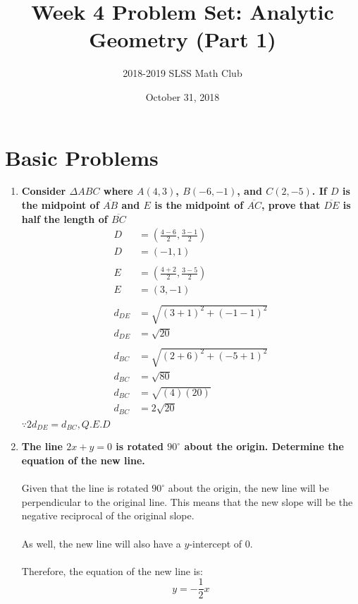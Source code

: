 \documentclass[12pt]{article}
\title{Week 4 Problem Set: Analytic Geometry (Part 1)\vspace{-3mm}}
\author{2018-2019 SLSS Math Club\vspace{-5mm}}
\date{October 31, 2018 \vspace{-5mm}}
\begin{document}
\maketitle

\section*{Basic Problems}
\begin{enumerate}
    \item \textbf{Consider $\Delta ABC$ where $A(4, 3)$, $B(-6, -1)$, and $C(2, -5)$. If $D$ is the midpoint of $\overline{AB}$ and $E$ is the midpoint of $\overline{AC}$, prove that $\overline{DE}$ is half the length of $\overline{BC}$}
    \begin{align*}
        D&=(\frac{4-6}{2}, \frac{3-1}{2}) \\
        D&=(-1, 1) \\ \\
        E&=(\frac{4+2}{2}, \frac{3-5}{2}) \\
        E&=(3, -1) \\ \\
        d_{DE}&=\sqrt{(3+1)^2+(-1-1)^2} \\
        d_{DE}&=\sqrt{20} \\ \\
        d_{BC}&=\sqrt{(2+6)^2+(-5+1)^2} \\
        d_{BC}&=\sqrt{80} \\ 
        d_{BC}&=\sqrt{(4)(20)} \\
        d_{BC}&=2\sqrt{20} \\ 
    \end{align*}
    $\because 2d_{DE} = d_{BC}, Q.E.D$
    
    \item \textbf{The line $2x + y = 0$ is rotated $90^{\circ}$ about the origin. Determine the equation of the new line.} \\ \\
    Given that the line is rotated $90^{\circ}$ about the origin, the new line will be perpendicular to the original line. This means that the new slope will be the negative reciprocal of the original slope. \\ \\
    As well, the new line will also have a $y$-intercept of $0$. \\ \\
    Therefore, the equation of the new line is:
    \begin{equation*}
        y = -\frac{1}{2}x
    \end{equation*}
    
    \end{enumerate} \newpage
\end{document}
